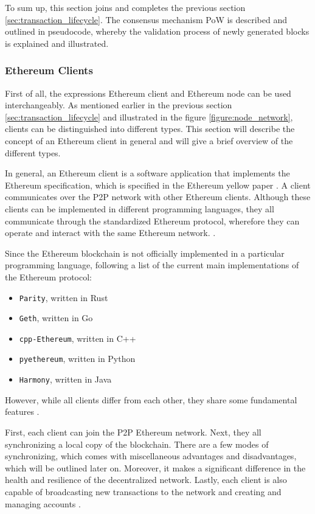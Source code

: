 To sum up, this section joins and completes the previous section \ref{sec:transaction_lifecycle}.
The consensus mechanism PoW is described and outlined in pseudocode, whereby
the validation process of newly generated blocks is explained and illustrated.
\clearpage

\subsubsection{Ethereum Clients}
\label{sec:nodes}

First of all, the expressions Ethereum client and Ethereum node can be used interchangeably. 
As mentioned earlier in the previous section \ref{sec:transaction_lifecycle} 
and illustrated in the figure \ref{figure:node_network}, clients can be distinguished into different types. 
This section will describe the concept of an Ethereum client in general and will give a brief overview of the different
types.

In general, an Ethereum client is a software application 
that implements the Ethereum specification, which is specified in the Ethereum yellow paper .
A client communicates over the P2P network with other Ethereum clients.
Although these clients can be implemented in different programming languages, they all communicate through
the standardized Ethereum protocol, wherefore they can operate and interact with the same Ethereum network. . 

Since the Ethereum blockchain is not officially implemented in a particular programming language, 
following a list of the current main implementations of the Ethereum protocol:

\begin{itemize}
	\item \texttt{Parity}, written in Rust
	\item \texttt{Geth}, written in Go
	\item \texttt{cpp-Ethereum}, written in C++
	\item \texttt{pyethereum}, written in Python
	\item \texttt{Harmony}, written in Java 
\end{itemize}

However, while all clients differ from each other, they share some fundamental features .

First, each client can join the P2P Ethereum network. 
Next, they all synchronizing a local copy of the blockchain.
There are a few modes of synchronizing, which comes with miscellaneous advantages and disadvantages, 
which will be outlined later on. Moreover, it makes a significant difference 
in the health and resilience of the decentralized network. 
Lastly, each client is also capable of broadcasting new transactions to the network and creating and 
managing accounts .

